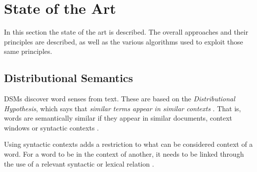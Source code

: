 \chapter{State of the Art}
\label{sec:stateofart}

In this section the state of the art is described. The overall approaches and
their principles are described, as well as the various algorithms used to
exploit those same principles.

\section{Distributional Semantics}

\acp{DSM} discover word senses from text. These are based on the
\textit{Distributional Hypothesis}, which says that \textit{similar terms
appear in similar contexts} \cite{curran2004distributional}. That is, words are
semantically similar if they appear in similar documents, context windows or
syntactic contexts \cite{van2010mining}.

Using syntactic contexts adds a restriction to what can be considered context of
a word. For a word to be in the context of another, it needs to be linked
through the use of a relevant syntactic or lexical relation
\cite{baroni2010distributional}.








